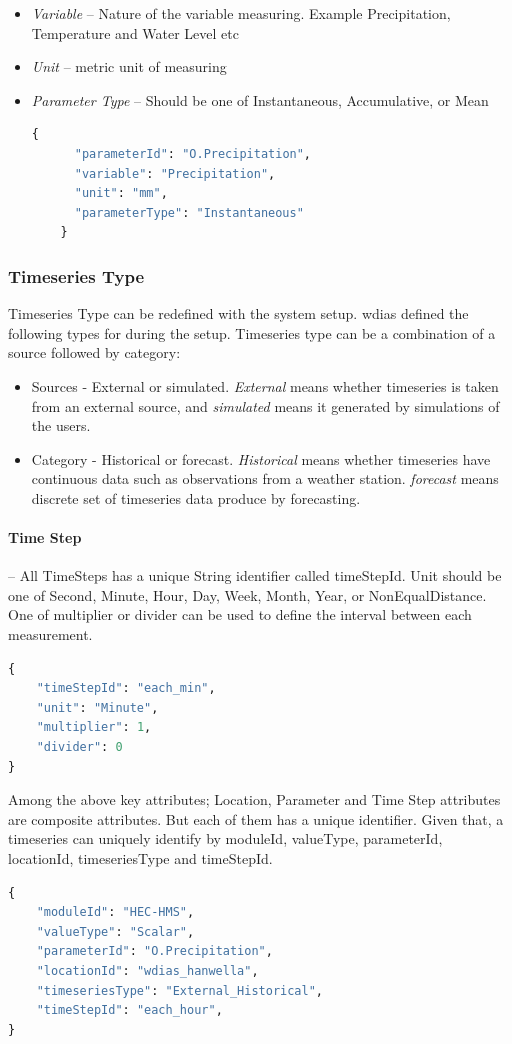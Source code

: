 \begin{itemize}  
  \item \emph{Variable} -- Nature of the variable measuring. Example Precipitation, Temperature and Water Level etc
  \item \emph{Unit} -- metric unit of measuring
  \item \emph{Parameter Type} -- Should be one of Instantaneous, Accumulative, or Mean
  \begin{lstlisting}[language=Python]
    {
      "parameterId": "O.Precipitation",
      "variable": "Precipitation",
      "unit": "mm",
      "parameterType": "Instantaneous"
    }
  \end{lstlisting}
\end{itemize}

\subsubsection{Timeseries Type}
Timeseries Type can be redefined with the system setup. \acrshort{wdias} defined the following types for during the setup. Timeseries type can be a combination of a source followed by category:
\begin{itemize}
  \item Sources - External or simulated. \emph{External} means whether timeseries is taken from an external source, and \emph{simulated} means it generated by simulations of the users.
  \item Category - Historical or forecast. \emph{Historical} means whether timeseries have continuous data such as observations from a weather station. \emph{forecast} means discrete set of timeseries data produce by forecasting.
\end{itemize}

\paragraph{Time Step}-- All TimeSteps has a unique String identifier called timeStepId. Unit should be one of Second, Minute, Hour, Day, Week, Month, Year, or NonEqualDistance. One of multiplier or divider can be used to define the interval between each measurement.
\begin{lstlisting}[language=Python]
{
    "timeStepId": "each_min",
    "unit": "Minute",
    "multiplier": 1,
    "divider": 0
}
\end{lstlisting}

Among the above key attributes; Location, Parameter and Time Step attributes are composite attributes. But each of them has a unique identifier.
Given that, a timeseries can uniquely identify by moduleId, valueType, parameterId, locationId, timeseriesType and timeStepId.
\begin{lstlisting}[language=Python]
{
	"moduleId": "HEC-HMS",
	"valueType": "Scalar",
	"parameterId": "O.Precipitation",
	"locationId": "wdias_hanwella",
	"timeseriesType": "External_Historical",
	"timeStepId": "each_hour",
}
\end{lstlisting}

